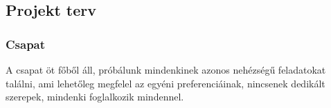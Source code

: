 \subsection{Projekt terv}
\subsubsection{Csapat}
A csapat öt főből áll, próbálunk mindenkinek azonos nehézségű feladatokat találni, 
ami lehetőleg megfelel az egyéni preferenciáinak, nincsenek dedikált szerepek, mindenki foglalkozik mindennel.

